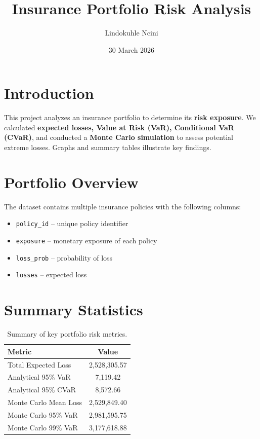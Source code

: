 \documentclass[12pt,a4paper]{article}
\title{Insurance Portfolio Risk Analysis}
\author{Lindokuhle Ncini}
\date{30 March 2026}
\begin{document}
\maketitle

\section{Introduction}

This project analyzes an insurance portfolio to determine its \textbf{risk exposure}. 
We calculated \textbf{expected losses, Value at Risk (VaR), Conditional VaR (CVaR)}, 
and conducted a \textbf{Monte Carlo simulation} to assess potential extreme losses. 
Graphs and summary tables illustrate key findings.

\section{Portfolio Overview}

The dataset contains multiple insurance policies with the following columns:

\begin{itemize}
    \item \texttt{policy\_id} -- unique policy identifier
    \item \texttt{exposure} -- monetary exposure of each policy
    \item \texttt{loss\_prob} -- probability of loss
    \item \texttt{losses} -- expected loss
\end{itemize}

\section{Summary Statistics}

\begin{table}[h!]
\centering
\begin{tabular}{lc}
\toprule
\textbf{Metric} & \textbf{Value} \\
\midrule
Total Expected Loss & 2,528,305.57 \\
Analytical 95\% VaR & 7,119.42 \\
Analytical 95\% CVaR & 8,572.66 \\
Monte Carlo Mean Loss & 2,529,849.40 \\
Monte Carlo 95\% VaR & 2,981,595.75 \\
Monte Carlo 99\% VaR & 3,177,618.88 \\
\bottomrule
\end{tabular}
\caption{Summary of key portfolio risk metrics.}
\end{table}
\end{document}
